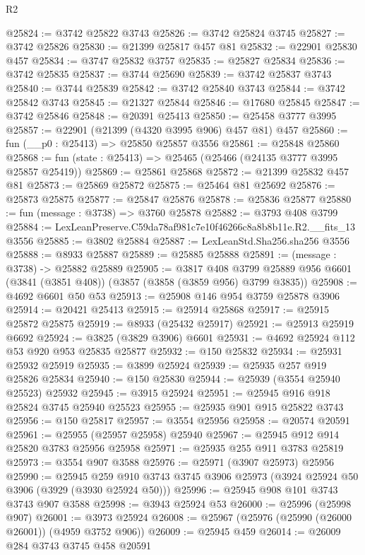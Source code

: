 \begin{lexlean}{R2}
\begin{coremodule}
@25824 := @3742 @25822 @3743
@25826 := @3742 @25824 @3745
@25827 := @3742 @25826
@25830 := @21399 @25817 @457 @81
@25832 := @22901 @25830 @457
@25834 := @3747 @25832 @3757
@25835 := @25827 @25834
@25836 := @3742 @25835
@25837 := @3744 @25690
@25839 := @3742 @25837 @3743
@25840 := @3744 @25839
@25842 := @3742 @25840 @3743
@25844 := @3742 @25842 @3743
@25845 := @21327 @25844
@25846 := @17680 @25845
@25847 := @3742 @25846
@25848 := @20391 @25413
@25850 := @25458 @3777 @3995
@25857 := @22901 (@21399 (@4320 @3995 @906) @457 @81) @457
@25860 := fun (__p0 : @25413) => @25850 @25857 @3556
@25861 := @25848 @25860
@25868 := fun (state : @25413) => @25465 (@25466 (@24135 @3777 @3995 @25857 @25419))
@25869 := @25861 @25868
@25872 := @21399 @25832 @457 @81
@25873 := @25869 @25872
@25875 := @25464 @81 @25692
@25876 := @25873 @25875
@25877 := @25847 @25876
@25878 := @25836 @25877
@25880 := fun (message : @3738) => @3760 @25878
@25882 := @3793 @408 @3799
@25884 := LexLeanPreserve.C59da78af981c7e10f46266c8a8b8b11e.R2.__fits_13 @3556
@25885 := @3802 @25884
@25887 := LexLeanStd.Sha256.sha256 @3556
@25888 := @8933 @25887
@25889 := @25885 @25888
@25891 := (message : @3738) -> @25882 @25889
@25905 := @3817
    @408
    @3799
    @25889
    @956
    @6601
    (@3841 (@3851 @408))
    (@3857 (@3858 (@3859 @956) @3799 @3835))
@25908 := @4692 @6601 @50 @53
@25913 := @25908 @146 @954 @3759 @25878 @3906
@25914 := @20421 @25413
@25915 := @25914 @25868
@25917 := @25915 @25872 @25875
@25919 := @8933 (@25432 @25917)
@25921 := @25913 @25919 @6692
@25924 := @3825 (@3829 @3906) @6601
@25931 := @4692 @25924 @112 @53 @920 @953 @25835 @25877
@25932 := @150 @25832
@25934 := @25931 @25932 @25919
@25935 := @3899 @25924
@25939 := @25935 @257 @919 @25826 @25834
@25940 := @150 @25830
@25944 := @25939 (@3554 @25940 @25523) @25932
@25945 := @3915 @25924
@25951 := @25945 @916 @918 @25824 @3745 @25940 @25523
@25955 := @25935 @901 @915 @25822 @3743
@25956 := @150 @25817
@25957 := @3554 @25956
@25958 := @20574 @20591
@25961 := @25955 (@25957 @25958) @25940
@25967 := @25945 @912 @914 @25820 @3783 @25956 @25958
@25971 := @25935 @255 @911 @3783 @25819
@25973 := @3554 @907 @3588
@25976 := @25971 (@3907 @25973) @25956
@25990 := @25945
    @259
    @910
    @3743
    @3745
    @3906
    @25973
    (@3924 @25924 @50 @3906 (@3929 (@3930 @25924 @50)))
@25996 := @25945 @908 @101 @3743 @3743 @907 @3588
@25998 := @3943 @25924 @53
@26000 := @25996 (@25998 @907)
@26001 := @3973 @25924
@26008 := @25967 (@25976 (@25990 (@26000 @26001)) (@4959 @3752 @906))
@26009 := @25945 @459
@26014 := @26009 @284 @3743 @3745 @458 @20591

\end{coremodule}
\end{lexlean}
